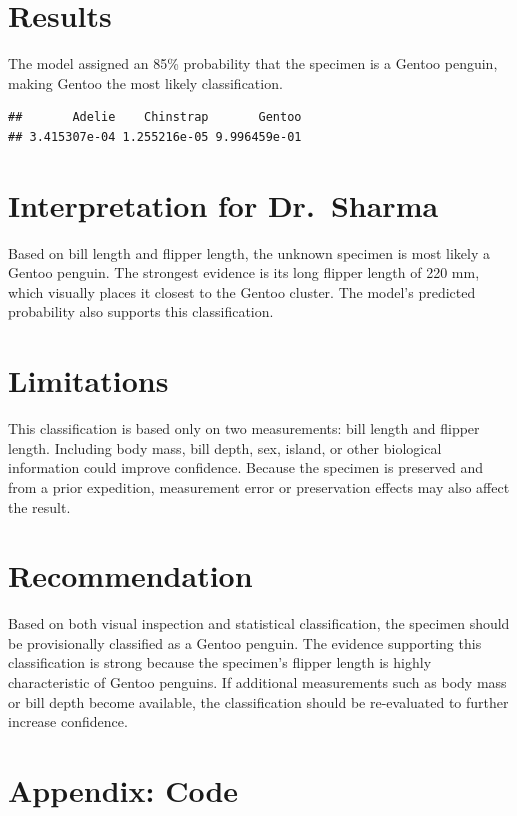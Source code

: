 \documentclass[
]{article}
\begin{document}
\section{Results}\label{results}

The model assigned an 85\% probability that the specimen is a Gentoo
penguin, making Gentoo the most likely classification.

\begin{verbatim}
##       Adelie    Chinstrap       Gentoo 
## 3.415307e-04 1.255216e-05 9.996459e-01
\end{verbatim}

\section{Interpretation for
Dr.~Sharma}\label{interpretation-for-dr.-sharma}

Based on bill length and flipper length, the unknown specimen is most
likely a Gentoo penguin. The strongest evidence is its long flipper
length of 220 mm, which visually places it closest to the Gentoo
cluster. The model's predicted probability also supports this
classification.

\section{Limitations}\label{limitations}

This classification is based only on two measurements: bill length and
flipper length. Including body mass, bill depth, sex, island, or other
biological information could improve confidence. Because the specimen is
preserved and from a prior expedition, measurement error or preservation
effects may also affect the result.

\section{Recommendation}\label{recommendation}

Based on both visual inspection and statistical classification, the
specimen should be provisionally classified as a Gentoo penguin. The
evidence supporting this classification is strong because the specimen's
flipper length is highly characteristic of Gentoo penguins. If
additional measurements such as body mass or bill depth become
available, the classification should be re-evaluated to further increase
confidence.

\section{Appendix: Code}\label{appendix-code}
\end{document}
